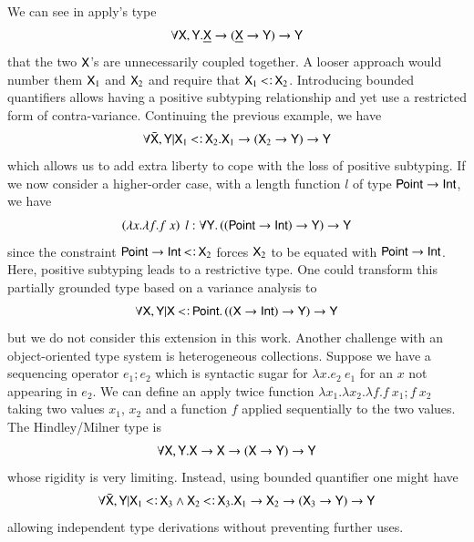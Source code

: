 \documentclass{report}
\begin{document}
  We can see in apply's type
  \begin{displaymath}
    \forall\textsf{X},\textsf{Y}.\underline{\textsf{X}}\rightarrow(\underline{\textsf{X}}\rightarrow\textsf{Y})\rightarrow\textsf{Y}
  \end{displaymath}
  that the two $\textsf{X}$'s are unnecessarily coupled together. A looser approach would
  number them $\textsf{X}_1$ and $\textsf{X}_2$ and require that $\type{X}_1\subtype\type{X}_2$.
  Introducing bounded quantifiers allows having a positive subtyping relationship 
  and yet use a restricted form of contra-variance. Continuing the previous example, we have
  \begin{displaymath}
    \forall\bar{\type{X}},\type{Y}|\type{X}_1\subtype\type{X}_2.\type{X}_1\fun(\type{X}_2\fun\type{Y})\fun\type{Y}
  \end{displaymath}
  which allows us to add extra liberty to cope with the loss of positive subtyping.
  If we now consider a higher-order case, with a length function $l$ of type $\textsf{Point}\rightarrow\textsf{Int}$,
  we have
  \begin{displaymath}
    \left({\lambda x.\lambda f.f\ x}\right)\ l : \forall\textsf{Y}.\left({\left({\textsf{Point}\rightarrow\textsf{Int}}\right)\rightarrow\textsf{Y}}\right)\rightarrow\textsf{Y}
  \end{displaymath}
  since the constraint $\type{Point}\fun\Int\subtype\type{X}_2$ forces $\textsf{X}_2$ to be
  equated with $\textsf{Point}\rightarrow\textsf{Int}$. Here, positive subtyping leads to a restrictive type. One could transform this
  partially grounded type based on a variance analysis to
  \begin{displaymath}
    \forall\type{X},\type{Y}|\type{X}\subtype\type{Point}.\lrp{\lrp{\type{X}\fun\Int}\fun\type{Y}}\fun\type{Y}
  \end{displaymath}
  but we do not consider this extension in this work. Another challenge
  with an object-oriented type system is heterogeneous collections.
  Suppose we have a sequencing operator $e_1;e_2$ which is syntactic sugar
  for $\lambda x.e_2\ e_1$ for an $x$ not appearing in $e_2$. We can define
  an apply twice function $\lambda x_1.\lambda x_2.\lambda f.f\ x_1;f\ x_2$
  taking two values $x_1$, $x_2$ and a function $f$ applied sequentially
  to the two values. The Hindley/Milner type is
  \begin{displaymath}
	  \forall\textsf{X},\textsf{Y}.\textsf{X}\rightarrow\textsf{X}\rightarrow(\textsf{X}\rightarrow\textsf{Y})\rightarrow\textsf{Y}
  \end{displaymath}
  whose rigidity is very limiting. Instead, using bounded quantifier one
  might have
  \begin{displaymath}
	  \forall\bar{\type{X}},\type{Y}|\type{X}_1\subtype\type{X}_3\land\type{X}_2\subtype\type{X}_3.\type{X}_1\fun\type{X}_2\fun(\type{X}_3\fun\type{Y})\fun\type{Y}
  \end{displaymath}
  allowing independent type derivations without preventing further uses.
  
\end{document}
